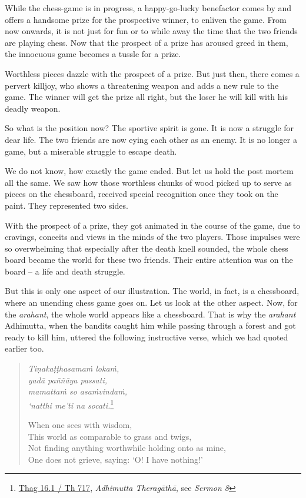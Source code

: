 While the chess-game is in progress, a happy-go-lucky benefactor comes by and offers a handsome prize for the prospective winner, to enliven the game. From now onwards, it is not just for fun or to while away the time that the two friends are playing chess. Now that the prospect of a prize has aroused greed in them, the innocuous game becomes a tussle for a prize.

Worthless pieces dazzle with the prospect of a prize. But just then, there comes a pervert killjoy, who shows a threatening weapon and adds a new rule to the game. The winner will get the prize all right, but the loser he will kill with his deadly weapon.

So what is the position now? The sportive spirit is gone. It is now a struggle for dear life. The two friends are now eying each other as an enemy. It is no longer a game, but a miserable struggle to escape death.

We do not know, how exactly the game ended. But let us hold the post mortem all the same. We saw how those worthless chunks of wood picked up to serve as pieces on the chessboard, received special recognition once they took on the paint. They represented two sides.

With the prospect of a prize, they got animated in the course of the game, due to cravings, conceits and views in the minds of the two players. Those impulses were so overwhelming that especially after the death knell sounded, the whole chess board became the world for these two friends. Their entire attention was on the board -- a life and death struggle.

But this is only one aspect of our illustration. The world, in fact, is a chessboard, where an unending chess game goes on. Let us look at the other aspect. Now, for the \emph{arahant}, the whole world appears like a chessboard. That is why the \emph{arahant} Adhimutta, when the bandits caught him while passing through a forest and got ready to kill him, uttered the following instructive verse, which we had quoted earlier too.

\begin{quote}
\emph{Tiṇakaṭṭhasamaṁ lokaṁ,}\\
\emph{yadā paññāya passati,}\\
\emph{mamattaṁ so asaṁvindaṁ,}\\
\emph{`natthi me'ti na socati.}\footnote{\href{https://suttacentral.net/thag16.1/pli/ms}{Thag 16.1 / Th 717}, \emph{Adhimutta Theragāthā}, see \emph{Sermon 8}}

When one sees with wisdom,\\
This world as comparable to grass and twigs,\\
Not finding anything worthwhile holding onto as mine,\\
One does not grieve, saying: `O! I have nothing!'
\end{quote}

